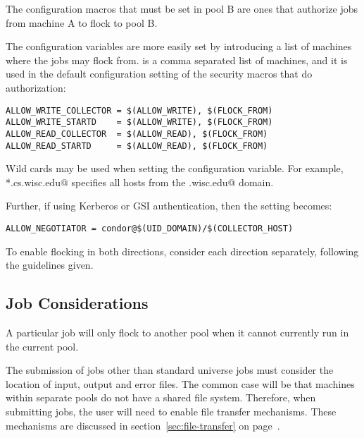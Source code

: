 The configuration macros that must be set in 
pool B are ones that authorize jobs from machine A
to flock to pool B.

The configuration variables are more easily
set by introducing a list of machines where the jobs may flock from. 
 is a comma separated list of machines,
and  it is used in the default configuration setting
of the security macros that do authorization:
\footnotesize
\begin{verbatim}
ALLOW_WRITE_COLLECTOR = $(ALLOW_WRITE), $(FLOCK_FROM)
ALLOW_WRITE_STARTD    = $(ALLOW_WRITE), $(FLOCK_FROM)
ALLOW_READ_COLLECTOR  = $(ALLOW_READ), $(FLOCK_FROM)
ALLOW_READ_STARTD     = $(ALLOW_READ), $(FLOCK_FROM)
\end{verbatim}
\normalsize

Wild cards may be used when setting the 
configuration variable.
For example, \verb@*.cs.wisc.edu@ specifies all hosts
from the \verb@cs.wisc.edu@ domain. 

Further, if using Kerberos or GSI authentication, then the setting
becomes:
\footnotesize
\begin{verbatim}
ALLOW_NEGOTIATOR = condor@$(UID_DOMAIN)/$(COLLECTOR_HOST)
\end{verbatim}
\normalsize

To enable flocking in both directions, consider each direction
separately, following the guidelines given.

\subsection{\label{sec:Jobs-Flocking}Job Considerations}

A particular job will only flock to another pool
when it cannot currently run in the current pool.

The submission of jobs other than standard universe jobs must consider
the location of input, output and error files.
The common case will be that machines within separate pools
do not have a shared file system.
Therefore, when submitting jobs, the user will need to enable
file transfer mechanisms.
These mechanisms are discussed in
section~\ref{sec:file-transfer} on page~\pageref{sec:file-transfer}.
